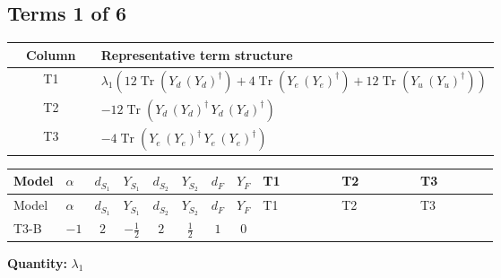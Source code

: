 \documentclass[8pt]{article}
\begin{document}
\begin{landscape}
\subsection*{Terms 1 of 6}
\begin{center}
\begin{tabular}{@{}c >{\raggedright\arraybackslash}p{0.82\linewidth}@{}}
\toprule
Column & Representative term structure \\
\midrule
T1 & \(\displaystyle {\lambda_1} (12 \operatorname{Tr}\!\left({Y_d}\,\left({Y_d}\right)^{\dagger}\right)+4 \operatorname{Tr}\!\left({Y_e}\,\left({Y_e}\right)^{\dagger}\right)+12 \operatorname{Tr}\!\left({Y_u}\,\left({Y_u}\right)^{\dagger}\right))\) \\
\midrule
T2 & \(\displaystyle -12 \operatorname{Tr}\!\left({Y_d}\,\left({Y_d}\right)^{\dagger}\,{Y_d}\,\left({Y_d}\right)^{\dagger}\right)\) \\
\midrule
T3 & \(\displaystyle -4 \operatorname{Tr}\!\left({Y_e}\,\left({Y_e}\right)^{\dagger}\,{Y_e}\,\left({Y_e}\right)^{\dagger}\right)\) \\
\midrule
\bottomrule
\end{tabular}
\end{center}
\smallskip
\tiny
\begin{longtable}{@{}llcccccc >{\raggedright\arraybackslash}p{0.21\linewidth} >{\raggedright\arraybackslash}p{0.21\linewidth} >{\raggedright\arraybackslash}p{0.21\linewidth}@{}}
\toprule
Model & $\alpha$ & $d_{S_1}$ & $Y_{S_1}$ & $d_{S_2}$ & $Y_{S_2}$ & $d_F$ & $Y_F$ & T1 & T2 & T3 \\
\midrule
\endfirsthead
\toprule
Model & $\alpha$ & $d_{S_1}$ & $Y_{S_1}$ & $d_{S_2}$ & $Y_{S_2}$ & $d_F$ & $Y_F$ & T1 & T2 & T3 \\
\midrule
\endhead
T3-B & $-1$ & $2$ & $-\frac{1}{2}$ & $2$ & $\frac{1}{2}$ & $1$ & $0$ & \scriptsize\adjustbox{max width=\linewidth}{$\begin{gathered} {\lambda_1} (12 \operatorname{Tr}\!\left({Y_d}\,\left({Y_d}\right)^{\dagger}\right)+4 \operatorname{Tr}\!\left({Y_e}\,\left({Y_e}\right)^{\dagger}\right)+12 \operatorname{Tr}\!\left({Y_u}\,\left({Y_u}\right)^{\dagger}\right))\end{gathered}$} & \scriptsize\adjustbox{max width=\linewidth}{$\begin{gathered} -12 \operatorname{Tr}\!\left({Y_d}\,\left({Y_d}\right)^{\dagger}\,{Y_d}\,\left({Y_d}\right)^{\dagger}\right)\end{gathered}$} & \scriptsize\adjustbox{max width=\linewidth}{$\begin{gathered} -4 \operatorname{Tr}\!\left({Y_e}\,\left({Y_e}\right)^{\dagger}\,{Y_e}\,\left({Y_e}\right)^{\dagger}\right)\end{gathered}$} \\
\midrule
\bottomrule
\end{longtable}
\clearpage
\noindent\textbf{Quantity: }$\lambda_1$\par\smallskip

\end{landscape}
\end{document}
